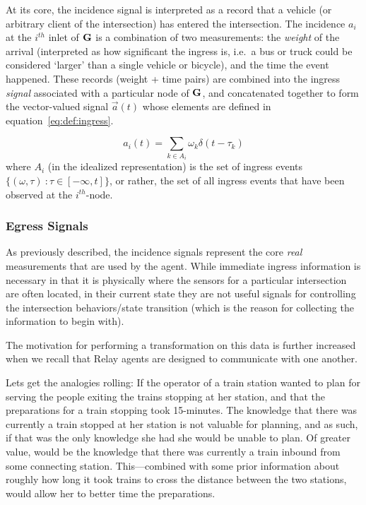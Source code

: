 \documentclass{report}
\begin{document}
At its core, the incidence signal is interpreted as a record that a vehicle (or arbitrary client of the intersection) has entered the intersection.
The incidence $a_i$ at the $i^{th}$ inlet of $\bf{G}$ is a combination of two measurements: the \emph{weight} of the arrival (interpreted as how significant the ingress is, i.e.\ a bus or truck could be considered `larger' than a single vehicle or bicycle), and the time the event happened.
These records (weight + time pairs) are combined into the ingress \emph{signal} associated with a particular node of $\bf{G}$, and concatenated together to form the vector-valued signal $\vec{a}(t)$ whose elements are defined in equation~\eqref{eq:def:ingress}.

\begin{equation}\label{eq:def:ingress}
	a_i(t) = \sum_{k \in A_i} \omega_k \delta(t - \tau_k)
\end{equation}
where $A_i$ (in the idealized representation) is the set of ingress events $\{(\omega, \tau)\ : \tau \in [-\infty, t]\}$, or rather, the set of all ingress events that have been observed at the $i^{th}$-node.


\subsubsection{Egress Signals}
\label{sec:def:egress}

As previously described, the incidence signals represent the core \emph{real} measurements that are used by the agent.
While immediate ingress information is necessary in that it is physically where the sensors for a particular intersection are often located, in their current state they are not useful signals for controlling the intersection behaviors/state transition (which is the reason for collecting the information to begin with).

The motivation for performing a transformation on this data is further increased when we recall that Relay agents are designed to communicate with one another.

Lets get the analogies rolling: If the operator of a train station wanted to plan for serving the people exiting the trains stopping at her station, and that the preparations for a train stopping took 15-minutes.
The knowledge that there was currently a train stopped at her station is not valuable for planning, and as such, if that was the only knowledge she had she would be unable to plan.
Of greater value, would be the knowledge that there was currently a train inbound from some connecting station.
This---combined with some prior information about roughly how long it took trains to cross the distance between the two stations, would allow her to better time the preparations.
\end{document}
